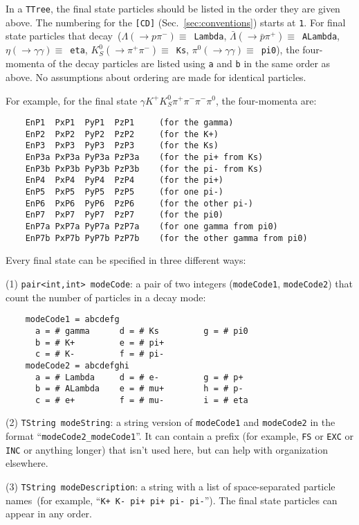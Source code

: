 \documentclass[11pt]{article}
\begin{document}
In a {\tt TTree}, the final state particles should be listed in the order they are given above.  The numbering for the {\tt [CD]} (Sec.~\ref{sec:conventions}) starts at {\tt 1}.  For final state particles that decay~($\Lambda (\to p \pi^-) \equiv $~{\tt Lambda}, 
$\bar{\Lambda} (\to \bar{p} \pi^+) \equiv $~{\tt ALambda}, $\eta (\to \gamma\gamma) \equiv $~{\tt eta}, $K^0_S (\to \pi^+\pi^-) \equiv $~{\tt Ks}, $\pi^0 (\to \gamma\gamma) \equiv $~{\tt pi0}), the four-momenta of the decay particles are listed using {\tt a} and {\tt b} in the same order as above.  No assumptions about ordering are made for identical particles.

For example, for the final state $\gamma K^+ K^0_S \pi^+ \pi^- \pi^- \pi^0$, the four-momenta are:
\begin{verbatim}
    EnP1  PxP1  PyP1  PzP1     (for the gamma)
    EnP2  PxP2  PyP2  PzP2     (for the K+)
    EnP3  PxP3  PyP3  PzP3     (for the Ks)
    EnP3a PxP3a PyP3a PzP3a    (for the pi+ from Ks)
    EnP3b PxP3b PyP3b PzP3b    (for the pi- from Ks)
    EnP4  PxP4  PyP4  PzP4     (for the pi+)
    EnP5  PxP5  PyP5  PzP5     (for one pi-)
    EnP6  PxP6  PyP6  PzP6     (for the other pi-)
    EnP7  PxP7  PyP7  PzP7     (for the pi0)
    EnP7a PxP7a PyP7a PzP7a    (for one gamma from pi0)
    EnP7b PxP7b PyP7b PzP7b    (for the other gamma from pi0)
\end{verbatim}





Every final state can be specified in three different ways:

(1) {\tt pair<int,int> modeCode}: a pair of two integers ({\tt modeCode1}, {\tt modeCode2}) that count the number of particles in a decay mode:
\begin{verbatim}
    modeCode1 = abcdefg
      a = # gamma      d = # Ks         g = # pi0
      b = # K+         e = # pi+
      c = # K-         f = # pi-
    modeCode2 = abcdefghi
      a = # Lambda     d = # e-         g = # p+
      b = # ALambda    e = # mu+        h = # p-
      c = # e+         f = # mu-        i = # eta
\end{verbatim}
(2) {\tt TString modeString}: a string version of {\tt modeCode1} and {\tt modeCode2} in the format ``{\tt modeCode2\_modeCode1}''.  It can contain a prefix (for example, {\tt FS} or {\tt EXC} or {\tt INC} or anything longer) that isn't used here, but can help with organization elsewhere.  

(3) {\tt TString modeDescription}: a string with a list of space-separated particle names~(for example, ``{\tt K+ K- pi+ pi+ pi- pi-}'').  The final state particles can appear in any order. 
\end{document}
